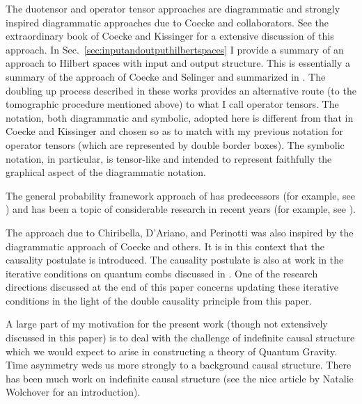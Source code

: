 \documentclass[10pt]{article}
\begin{document}
The duotensor and operator tensor approaches are diagrammatic and strongly inspired diagrammatic approaches due to Coecke and collaborators.  See the extraordinary book of Coecke and Kissinger \cite{coecke2017picturing} for a extensive discussion of this approach.  In Sec.\ \ref{sec:inputandoutputhilbertspaces} I provide a summary of an approach to Hilbert spaces with input and output structure.  This is essentially a summary of the approach of Coecke \cite{coecke2007linearizing} and Selinger \cite{selinger2007dagger} and summarized in \cite{coecke2017picturing}.  The doubling up process described in these works provides an alternative route (to the tomographic procedure mentioned above) to what I call operator tensors.  The notation, both diagrammatic and symbolic, adopted here is different from that in Coecke and Kissinger and chosen so as to match with my previous notation for operator tensors (which are represented by double border boxes).  The symbolic notation, in particular, is tensor-like and intended to represent faithfully the graphical aspect of the diagrammatic notation.

The general probability framework approach of \cite{hardy2001quantum} has predecessors (for example, see \cite{mackey1963mathematical, ludwig1985axiomatic, davies1970operational, gunson1967algebraic, mielnik1969theory, araki1980characterization, gudder1999convex, foulis1979empirical, fivel1994interference}) and has been a topic of considerable research in recent years (for example, see \cite{barrett2007information, barnum2011information, chiribella2010probabilistic, chiribella2010informational, hardy2009foliable, hardy2009operational, hardy2009operational2, oeckl2016local}).

The approach due to Chiribella, D'Ariano, and Perinotti \cite{chiribella2010probabilistic, chiribella2010informational} was also inspired by the diagrammatic approach of Coecke and others. It is in this context that the causality postulate is introduced.  The causality postulate is also at work in the iterative conditions on quantum combs discussed in \cite{chiribella2008quantum, chiribella2009theoretical}. One of the research directions discussed at the end of this paper concerns updating these iterative conditions in the light of the double causality principle from this paper.

A large part of my motivation for the present work (though not extensively discussed in this paper) is to deal with the challenge of indefinite causal structure which we would expect to arise in constructing a theory of Quantum Gravity.  Time asymmetry weds us more strongly to a background causal structure.  There has been much work on indefinite causal structure \cite{hardy2005probability, hardy2007towards, hardy2009quantum, chiribella2013quantum, oreshkov2012quantum, procopio2015experimental, hardy2020implementation} (see the nice article by Natalie Wolchover \cite{wolchover2021quantum} for an introduction).
\end{document}
